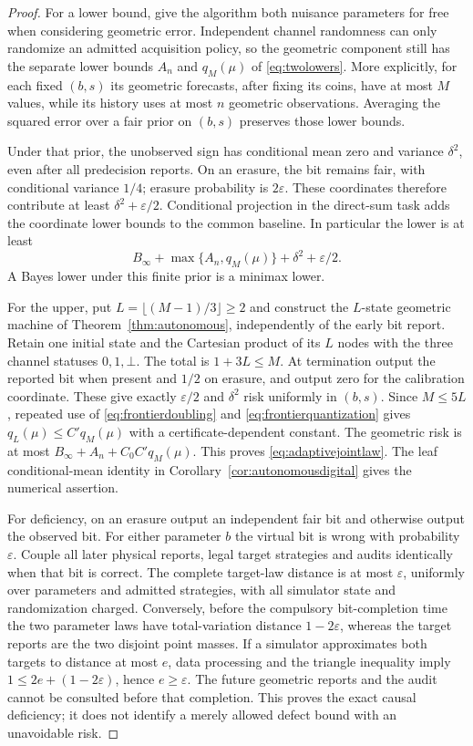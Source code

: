 \begin{proof}
For a lower bound, give the algorithm both nuisance parameters for free when considering geometric error. Independent channel randomness can only randomize an admitted acquisition policy, so the geometric component still has the separate lower bounds $A_n$ and $q_M(\mu)$ of \eqref{eq:twolowers}. More explicitly, for each fixed $(b,s)$ its geometric forecasts, after fixing its coins, have at most $M$ values, while its history uses at most $n$ geometric observations. Averaging the squared error over a fair prior on $(b,s)$ preserves those lower bounds.

Under that prior, the unobserved sign has conditional mean zero and variance $\delta^2$, even after all predecision reports. On an erasure, the bit remains fair, with conditional variance $1/4$; erasure probability is $2\varepsilon$. These coordinates therefore contribute at least $\delta^2+\varepsilon/2$. Conditional projection in the direct-sum task adds the coordinate lower bounds to the common baseline. In particular the lower is at least
\[
 B_\infty+\max\{A_n,q_M(\mu)\}+\delta^2+\varepsilon/2.
\]
A Bayes lower under this finite prior is a minimax lower.

For the upper, put $L=\lfloor(M-1)/3\rfloor\ge2$ and construct the $L$-state geometric machine of Theorem~\ref{thm:autonomous}, independently of the early bit report. Retain one initial state and the Cartesian product of its $L$ nodes with the three channel statuses $0,1,\bot$. The total is $1+3L\le M$. At termination output the reported bit when present and $1/2$ on erasure, and output zero for the calibration coordinate. These give exactly $\varepsilon/2$ and $\delta^2$ risk uniformly in $(b,s)$. Since $M\le5L$, repeated use of \eqref{eq:frontierdoubling} and \eqref{eq:frontierquantization} gives $q_L(\mu)\le C' q_M(\mu)$ with a certificate-dependent constant. The geometric risk is at most $B_\infty+A_n+C_0C'q_M(\mu)$. This proves \eqref{eq:adaptivejointlaw}. The leaf conditional-mean identity in Corollary~\ref{cor:autonomousdigital} gives the numerical assertion.

For deficiency, on an erasure output an independent fair bit and otherwise output the observed bit. For either parameter $b$ the virtual bit is wrong with probability $\varepsilon$. Couple all later physical reports, legal target strategies and audits identically when that bit is correct. The complete target-law distance is at most $\varepsilon$, uniformly over parameters and admitted strategies, with all simulator state and randomization charged. Conversely, before the compulsory bit-completion time the two parameter laws have total-variation distance $1-2\varepsilon$, whereas the target reports are the two disjoint point masses. If a simulator approximates both targets to distance at most $e$, data processing and the triangle inequality imply $1\le2e+(1-2\varepsilon)$, hence $e\ge\varepsilon$. The future geometric reports and the audit cannot be consulted before that completion. This proves the exact causal deficiency; it does not identify a merely allowed defect bound with an unavoidable risk.
\end{proof}
